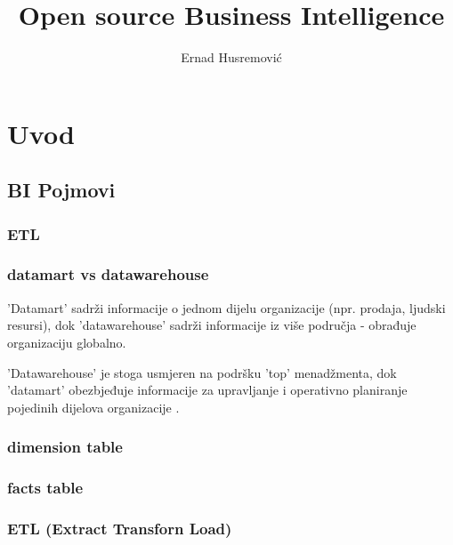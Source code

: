 \documentclass[times, utf8, seminar]{fit}
\begin{document}
\title{Open source Business Intelligence}

\author{Ernad Husremović}


\maketitle

\tableofcontents

\chapter{Uvod}

\section{BI Pojmovi}

\subsection{ETL}


\subsection{datamart vs datawarehouse}

'Datamart' sadrži informacije o jednom dijelu organizacije (npr. prodaja, ljudski resursi), dok 'datawarehouse' sadrži informacije iz više područja -  obrađuje organizaciju globalno. 

'Datawarehouse' je stoga usmjeren na podršku 'top' menadžmenta, dok 'datamart' obezbjeđuje informacije za upravljanje i operativno planiranje pojedinih dijelova organizacije  \cite[str.~391]{pentaho32}.

\subsection{dimension table}

\subsection{facts table}



\subsection{ETL (Extract Transforn Load)}
\end{document}
